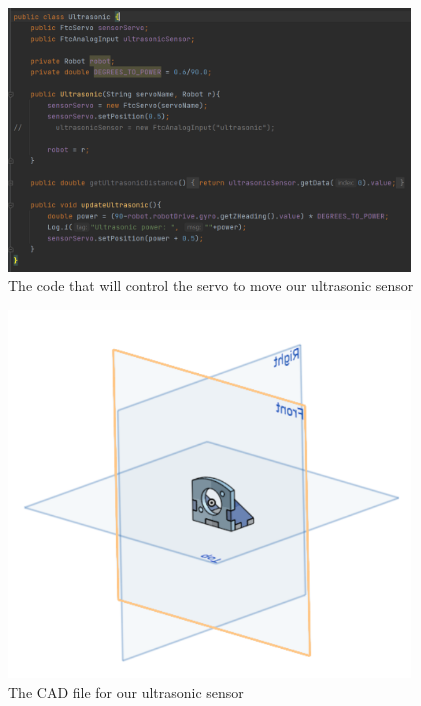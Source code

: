 \begin{figure}[htp]
\centering
\includegraphics[width=0.95\textwidth, angle=0]{Meetings/February/02-08-22/02-08-22 1.PNG}
\caption{The code that will control the servo to move our ultrasonic sensor}
\label{fig:020822_1}
\end{figure}

\begin{figure}[htp]
\centering
\includegraphics[width=0.95\textwidth, angle=0]{Meetings/February/02-08-22/02-08-22 2.PNG}
\caption{The CAD file for our ultrasonic sensor}
\label{fig:020822_2}
\end{figure}


